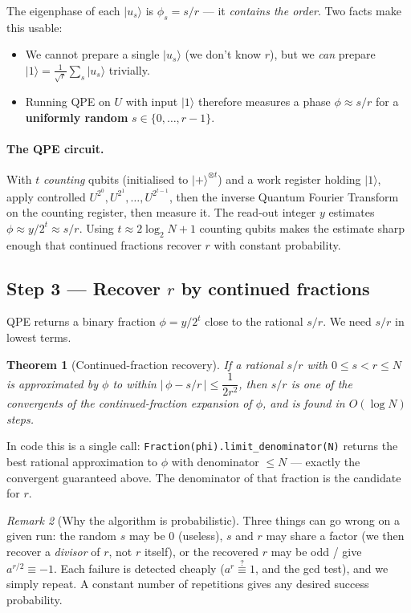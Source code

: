 \documentclass[11pt]{article}
\theoremstyle{plain}
\newtheorem{theorem}{Theorem}[section]
\theoremstyle{definition}
\theoremstyle{remark}
\newtheorem{remark}[theorem]{Remark}
\newcommand{\ket}[1]{\lvert #1 \rangle}
\begin{document}
The eigenphase of each $\ket{u_s}$ is $\phi_s = s/r$ --- it \emph{contains the order}. Two
facts make this usable:
\begin{itemize}[leftmargin=1.6em,itemsep=1pt,topsep=2pt]
  \item We cannot prepare a single $\ket{u_s}$ (we don't know $r$), but we \emph{can}
        prepare $\ket{1}=\tfrac{1}{\sqrt r}\sum_s\ket{u_s}$ trivially.
  \item Running QPE on $U$ with input $\ket{1}$ therefore measures a phase
        $\phi\approx s/r$ for a \textbf{uniformly random} $s\in\{0,\dots,r-1\}$.
\end{itemize}

\paragraph{The QPE circuit.} With $t$ \emph{counting} qubits (initialised to
$\ket{+}^{\otimes t}$) and a work register holding $\ket{1}$, apply controlled
$U^{2^{0}},U^{2^{1}},\dots,U^{2^{t-1}}$, then the inverse Quantum Fourier Transform on the
counting register, then measure it. The read-out integer $y$ estimates
$\phi\approx y/2^{t}\approx s/r$. Using $t\approx 2\log_2 N + 1$ counting qubits makes the
estimate sharp enough that continued fractions recover $r$ with constant probability.

\subsection{Step 3 --- Recover $r$ by continued fractions}

QPE returns a binary fraction $\phi=y/2^{t}$ close to the rational $s/r$. We need $s/r$ in
lowest terms.

\begin{theorem}[Continued-fraction recovery]\label{thm:cf}
If a rational $s/r$ with $0\le s<r\le N$ is approximated by $\phi$ to within
$|\,\phi - s/r\,| \le \dfrac{1}{2r^{2}}$, then $s/r$ is one of the \emph{convergents} of
the continued-fraction expansion of $\phi$, and is found in $O(\log N)$ steps.
\end{theorem}

In code this is a single call: \verb|Fraction(phi).limit_denominator(N)| returns the best
rational approximation to $\phi$ with denominator $\le N$ --- exactly the convergent
guaranteed above. The denominator of that fraction is the candidate for $r$.

\begin{remark}[Why the algorithm is probabilistic]
Three things can go wrong on a given run: the random $s$ may be $0$ (useless), $s$ and $r$
may share a factor (we then recover a \emph{divisor} of $r$, not $r$ itself), or the
recovered $r$ may be odd / give $a^{r/2}\equiv-1$. Each failure is detected cheaply
($a^{r}\stackrel{?}{\equiv}1$, and the gcd test), and we simply repeat. A constant number
of repetitions gives any desired success probability.
\end{remark}
\end{document}
